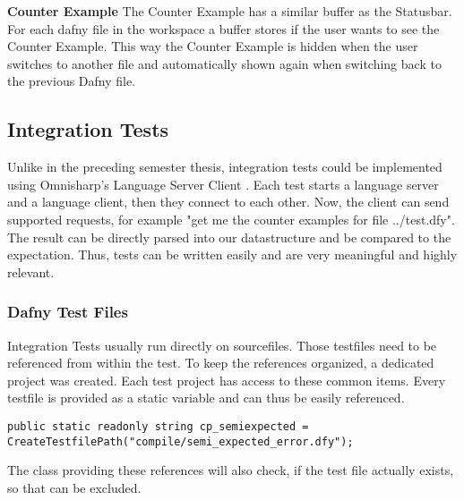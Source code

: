 {\bf Counter Example} \textendash{}
The Counter Example has a similar buffer as the Statusbar.
For each dafny file in the workspace a buffer stores if the user wants to see the Counter Example.
This way the Counter Example is hidden when the user switches to another file
and automatically shown again when switching back to the previous Dafny file. 

\subsection{Integration Tests}
Unlike in the preceding semester thesis, integration tests could be implemented using Omnisharp's Language Server Client \cite{omnisharpClient}. Each test starts a language server and a language client, then they connect to each other. Now, the client can send supported requests, for example "get me the counter examples for file ../test.dfy". The result can be directly parsed into our  datastructure and be compared to the expectation. Thus, tests can be written easily and are very meaningful and highly relevant.

\subsubsection{Dafny Test Files}
Integration Tests usually run directly on  sourcefiles. Those testfiles need to be referenced from within the test. To keep the references organized, a dedicated project  was created. Each test project has access to these common items. Every testfile is provided as a static variable and can thus be easily referenced.
\lstset{style=sharpc}
\begin{lstlisting}[caption={Test File Reference}, captionpos=b, label={lst:fileRef}]
public static readonly string cp_semiexpected = CreateTestfilePath("compile/semi_expected_error.dfy");
\end{lstlisting}
The class providing these references will also check, if the test file actually exists, so that  can be excluded.

